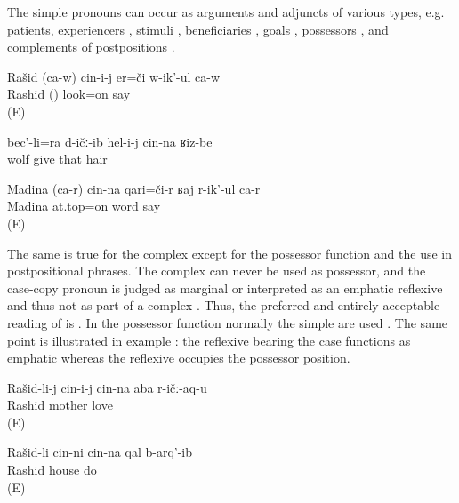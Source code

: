 The simple pronouns can occur as arguments and adjuncts of various types, e.g. patients, experiencers , stimuli , beneficiaries , goals , possessors , and complements of postpositions . 
%
\begin{exe}
	\ex	\label{ex:Rashid is looking at himselfA}
	\gll	Rašid	(ca-w)	cin-i-j	er=či	w-ik'-ul	ca-w\\
		Rashid	()		look=on	say	\\
	\glt	{} (E)

	\ex	\label{ex:‎‎‎The wolf gave him also his hair}
	\gll	bec'-li=ra	d-ičː-ib	hel-i-j	cin-na	ʁiz-be\\
		wolf	give	that		hair\\
	\glt	{}

	\ex	\label{ex:Madina is talking about herself}
	\gll	Madina	(ca-r)	cin-na	qari=či-r	ʁaj	r-ik'-ul	ca-r\\
		Madina			at.top=on	word	say	\\
	\glt	{} (E)
\end{exe}

The same is true for the complex  except for the possessor function and the use in postpositional phrases. The complex  can never be used as possessor, and the case-copy pronoun is judged as marginal or interpreted as an emphatic reflexive and thus not as part of a complex . Thus, the preferred and entirely acceptable reading of  is . In the possessor function normally the simple  are used . The same point is illustrated in example : the reflexive bearing the  case functions as emphatic  whereas the  reflexive occupies the possessor position.
%
\begin{exe}
	\ex	\label{ex:Rashid loves his mother}
		Rašid-li-j	cin-i-j	cin-na	aba	r-ičː-aq-u\\
		{}	Rashid			mother	love\\
	\glt	{} (E)

	\ex	\label{ex:Rashid himself / alone built his house}
	\gll	Rašid-li	cin-ni	cin-na	qal	b-arq'-ib\\
		Rashid			house	do\\
	\glt	{} (E)
\end{exe}

